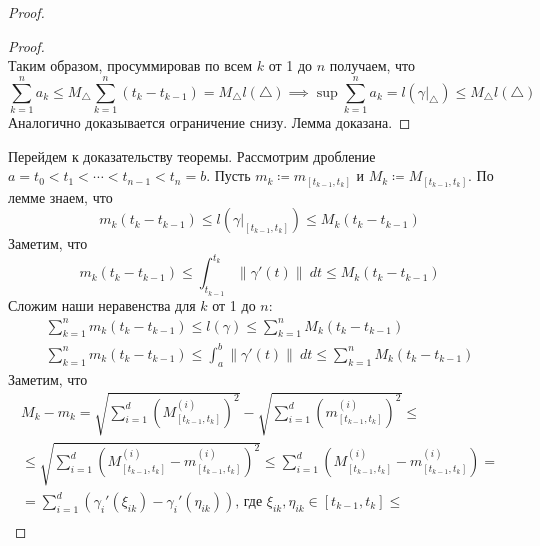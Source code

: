 \begin{proof}
\begin{proof}
\begin{equation*}
    \end{equation*}
    Таким образом, просуммировав по всем $k$ от 1 до $n$ получаем, что
    \begin{equation*}
      \sum\limits_{k = 1}^{n} a_k \leq
      M_{\triangle} \sum\limits_{k = 1}^{n}(t_k - t_{k - 1}) = M_{\triangle}l(\triangle)
      \implies
      \sup \sum\limits_{k = 1}^{n} a_k =
      l(\gamma \big|_{\triangle}) \leq M_{\triangle}l(\triangle)
    \end{equation*}
    Аналогично доказывается ограничение снизу. Лемма доказана.
  \end{proof}
  Перейдем к доказательству теоремы. Рассмотрим дробление $a = t_0 < t_1 < \dotsb < t_{n - 1} < t_n = b$. Пусть $m_k \coloneqq m_{[t_{k - 1}, t_k]}$ и $M_k \coloneqq M_{[t_{k - 1}, t_k]}$. По лемме знаем, что
  \begin{equation*}
    m_k(t_k - t_{k - 1}) \leq l(\gamma\big|_{[t_{k - 1}, t_k]}) \leq M_k(t_k - t_{k - 1})
  \end{equation*}
  Заметим, что
  \begin{equation*}
    m_k(t_k - t_{k - 1}) \leq
    \int_{t_{k - 1}}^{t_k} \|\gamma'(t) \| \: dt
    \leq M_k(t_k - t_{k - 1})
  \end{equation*}
  Сложим наши неравенства для $k$ от 1 до $n$:
  \begin{equation*}
    \begin{gathered}
      \sum\limits_{k = 1}^{n} m_k(t_k - t_{k - 1})
      \leq l(\gamma) \leq \sum\limits_{k = 1}^{n} M_k(t_k - t_{k - 1}) \\
      \sum\limits_{k = 1}^{n} m_k(t_k - t_{k - 1})
      \leq \int_{a}^{b} \|\gamma'(t) \| \: dt \leq \sum\limits_{k = 1}^{n} M_k(t_k - t_{k - 1})
    \end{gathered}
  \end{equation*}
  Заметим, что
  \begin{equation*}
    \begin{gathered}
      M_k - m_k = \sqrt{\sum\limits_{i = 1}^{d}\left(M_{[t_{k - 1}, t_k]}^{(i)}\right)^2} -
      \sqrt{\sum\limits_{i = 1}^{d}\left(m_{[t_{k - 1}, t_k]}^{(i)}\right)^2}
      \leq \\ \leq
      \sqrt{\sum_{i = 1}^{d}\left(M_{[t_{k - 1}, t_k]}^{(i)} - m_{[t_{k - 1}, t_k]}^{(i)}\right)^2} \leq
      \sum\limits_{i = 1}^{d}\left(M_{[t_{k - 1}, t_k]}^{(i)} - m_{[t_{k - 1}, t_{k}]}^{(i)}\right) = \\
      = \sum\limits_{i = 1}^{d}(\gamma_i'(\xi_{ik}) - \gamma_i'(\eta_{ik}))\text{, где }
      \xi_{ik}, \eta_{ik} \in [t_{k - 1}, t_k] \leq \\

\end{gathered}
\end{equation*}
\end{proof}
